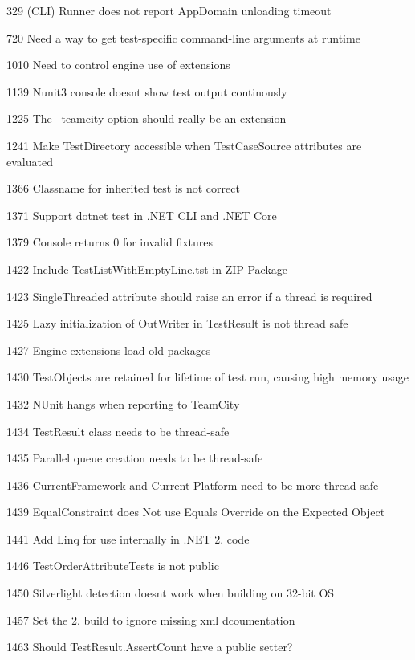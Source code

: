 \begin{DoxyItemize}
\item 329 (C\+LI) Runner does not report App\+Domain unloading timeout
\item 720 Need a way to get test-\/specific command-\/line arguments at runtime
\item 1010 Need to control engine use of extensions
\item 1139 Nunit3 console doesn\textquotesingle{}t show test output continously
\item 1225 The --teamcity option should really be an extension
\item 1241 Make Test\+Directory accessible when Test\+Case\+Source attributes are evaluated
\item 1366 Classname for inherited test is not correct
\item 1371 Support {\ttfamily dotnet test} in .N\+ET C\+LI and .N\+ET Core
\item 1379 Console returns 0 for invalid fixtures
\item 1422 Include Test\+List\+With\+Empty\+Line.\+tst in Z\+IP Package
\item 1423 Single\+Threaded attribute should raise an error if a thread is required
\item 1425 Lazy initialization of Out\+Writer in Test\+Result is not thread safe
\item 1427 Engine extensions load old packages
\item 1430 Test\+Objects are retained for lifetime of test run, causing high memory usage
\item 1432 N\+Unit hangs when reporting to Team\+City
\item 1434 Test\+Result class needs to be thread-\/safe
\item 1435 Parallel queue creation needs to be thread-\/safe
\item 1436 Current\+Framework and Current Platform need to be more thread-\/safe
\item 1439 Equal\+Constraint does Not use Equals Override on the Expected Object
\item 1441 Add Linq for use internally in .N\+ET 2. code
\item 1446 Test\+Order\+Attribute\+Tests is not public
\item 1450 Silverlight detection doesn\textquotesingle{}t work when building on 32-\/bit OS
\item 1457 Set the 2. build to ignore missing xml dcoumentation
\item 1463 Should Test\+Result.\+Assert\+Count have a public setter?

\end{DoxyItemize}
